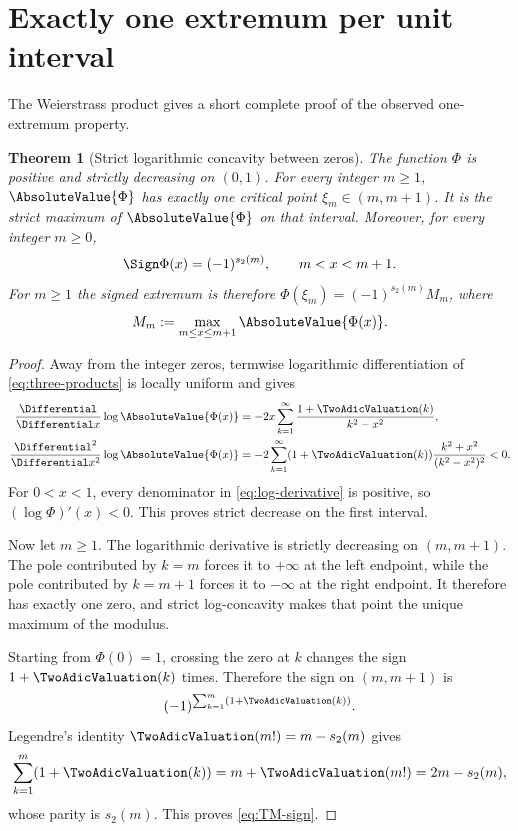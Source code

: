 \documentclass[11pt,oneside]{article}
\newtheorem{theorem}{Theorem}[section]
\theoremstyle{definition}
\theoremstyle{remark}
\newcommand{\Phiup}{\Phi}
\begin{document}
\section{Exactly one extremum per unit interval}
\label{sec:extrema}

The Weierstrass product gives a short complete proof of the observed one-extremum property.

\begin{theorem}[Strict logarithmic concavity between zeros]
\label{thm:unique-extremum}
The function $\Phiup$ is positive and strictly decreasing on $(0,1)$.  For every integer
$m\ge1$, $\AbsoluteValue{\Phiup}$ has exactly one critical point
$\xi_m\in(m,m+1)$.  It is the strict maximum of $\AbsoluteValue{\Phiup}$ on that interval.  Moreover,
for every integer $m\ge0$,
\begin{equation}
 \Sign\Phiup(x)=(-1)^{s_2(m)},\qquad m<x<m+1.
 \label{eq:TM-sign}
\end{equation}
For $m\ge1$ the signed extremum is therefore
$\Phiup(\xi_m)=(-1)^{s_2(m)}M_m$, where
\[
 M_m:=\max_{m\le x\le m+1}\AbsoluteValue{\Phiup(x)}.
\]
\end{theorem}

\begin{proof}
Away from the integer zeros, termwise logarithmic differentiation of
\eqref{eq:three-products} is locally uniform and gives
\begin{align}
 \frac{\Differential}{\Differential x}\log\AbsoluteValue{\Phiup(x)}
 &=-2x\sum_{k=1}^{\infty}\frac{1+\TwoAdicValuation(k)}{k^2-x^2},
 \label{eq:log-derivative}\\
 \frac{\Differential^2}{\Differential x^2}\log\AbsoluteValue{\Phiup(x)}
 &=-2\sum_{k=1}^{\infty}(1+\TwoAdicValuation(k))
   \frac{k^2+x^2}{(k^2-x^2)^2}<0.
 \label{eq:strict-log-concavity}
\end{align}
For $0<x<1$, every denominator in \eqref{eq:log-derivative} is positive, so
$(\log\Phiup)'(x)<0$.  This proves strict decrease on the first interval.

Now let $m\ge1$.  The logarithmic derivative is strictly decreasing on $(m,m+1)$.
The pole contributed by $k=m$ forces it to $+\infty$ at the left endpoint, while the pole
contributed by $k=m+1$ forces it to $-\infty$ at the right endpoint.  It therefore has
exactly one zero, and strict log-concavity makes that point the unique maximum of the modulus.

Starting from $\Phiup(0)=1$, crossing the zero at $k$ changes the sign
$1+\TwoAdicValuation(k)$ times.  Therefore the sign on $(m,m+1)$ is
\[
 (-1)^{\sum_{k=1}^{m}(1+\TwoAdicValuation(k))}.
\]
Legendre's identity $\TwoAdicValuation(m!)=m-s_2(m)$ gives
\[
 \sum_{k=1}^{m}(1+\TwoAdicValuation(k))=m+\TwoAdicValuation(m!)=2m-s_2(m),
\]
whose parity is $s_2(m)$.  This proves \eqref{eq:TM-sign}.
\end{proof}
\end{document}
